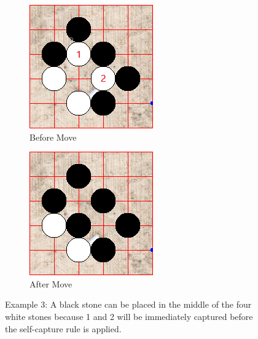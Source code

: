\documentclass{l4proj}
\begin{document}
\begin{figure}[!h]
\centering
\begin{subfigure}[b]{0.45\textwidth}
\includegraphics[width=\textwidth]{ex/Ex3-0.png}
\caption{Before Move}
\label{fig:ex3-0}
\end{subfigure}
\begin{subfigure}[b]{0.45\textwidth}
\includegraphics[width=\textwidth]{ex/Ex3-1.png}
\caption{After Move}
\label{fig:ex3-1}
\end{subfigure}
\caption{Example 3: A black stone can be placed in the middle of the four white stones because 1 and 2 will be immediately captured before the self-capture rule is applied. }
\label{fig:ex3}
\end{figure}
\end{document}
